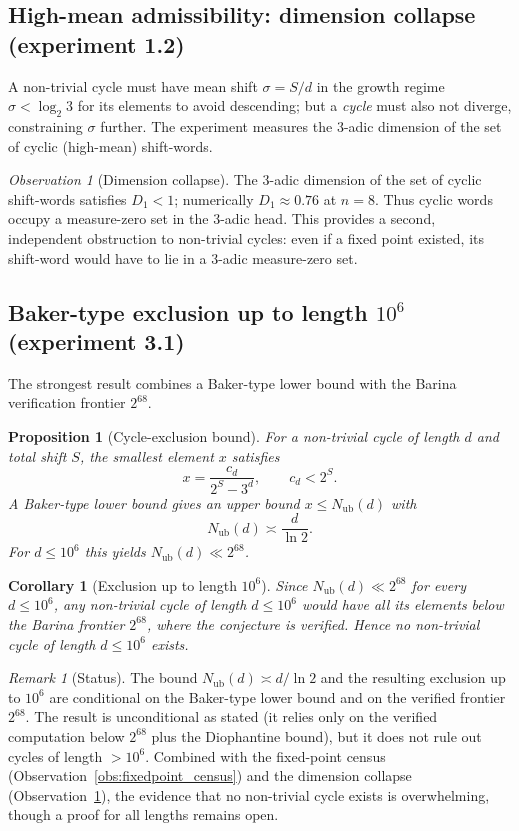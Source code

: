 \documentclass[12pt,a4paper]{article}
\newtheorem{proposition}[theorem]{Proposition}
\newtheorem{corollary}[theorem]{Corollary}
\theoremstyle{remark}
\newtheorem{remark}[theorem]{Remark}
\newtheorem{observation}[theorem]{Observation}
\begin{document}
\subsection{High-mean admissibility: dimension collapse (experiment 1.2)}
A non-trivial cycle must have mean shift $\sigma=S/d$ in the growth regime
$\sigma<\log_2 3$ for its elements to avoid descending; but a \emph{cycle} must
also not diverge, constraining $\sigma$ further. The experiment measures the
$3$-adic dimension of the set of cyclic (high-mean) shift-words.
\begin{observation}[Dimension collapse]
\label{obs:highmean_admissibility}
The $3$-adic dimension of the set of cyclic shift-words satisfies $D_1<1$;
numerically $D_1\approx0.76$ at $n=8$. Thus cyclic words occupy a
measure-zero set in the $3$-adic head. This provides a second, independent
obstruction to non-trivial cycles: even if a fixed point existed, its
shift-word would have to lie in a $3$-adic measure-zero set.
\end{observation}

\subsection{Baker-type exclusion up to length $10^6$ (experiment 3.1)}
\label{subsec:baker_exclusion}
The strongest result combines a Baker-type lower bound with the Barina
verification frontier $2^{68}$.
\begin{proposition}[Cycle-exclusion bound]
\label{prop:cycle_exclusion_bound}
For a non-trivial cycle of length $d$ and total shift $S$, the smallest
element $x$ satisfies
\[
x = \frac{c_d}{2^{S}-3^{d}},\qquad c_d < 2^{S}.
\]
A Baker-type lower bound gives an upper bound $x \le N_{\mathrm{ub}}(d)$ with
\[
N_{\mathrm{ub}}(d) \asymp \frac{d}{\ln 2}.
\]
For $d\le10^{6}$ this yields $N_{\mathrm{ub}}(d)\ll2^{68}$.
\end{proposition}
\begin{corollary}[Exclusion up to length $10^6$]
\label{cor:cycle_exclusion}
Since $N_{\mathrm{ub}}(d)\ll2^{68}$ for every $d\le10^{6}$, any non-trivial
cycle of length $d\le10^{6}$ would have all its elements below the Barina
frontier $2^{68}$, where the conjecture is verified. Hence no non-trivial cycle
of length $d\le10^{6}$ exists.
\end{corollary}
\begin{remark}[Status]
The bound $N_{\mathrm{ub}}(d)\asymp d/\ln 2$ and the resulting exclusion up to
$10^6$ are conditional on the Baker-type lower bound and on the verified
frontier $2^{68}$. The result is unconditional as stated (it relies only on the
verified computation below $2^{68}$ plus the Diophantine bound), but it does
not rule out cycles of length $>10^6$. Combined with the fixed-point census
(Observation~\ref{obs:fixedpoint_census}) and the dimension collapse
(Observation~\ref{obs:highmean_admissibility}), the evidence that no
non-trivial cycle exists is overwhelming, though a proof for all lengths
remains open.
\end{remark}
\end{document}

